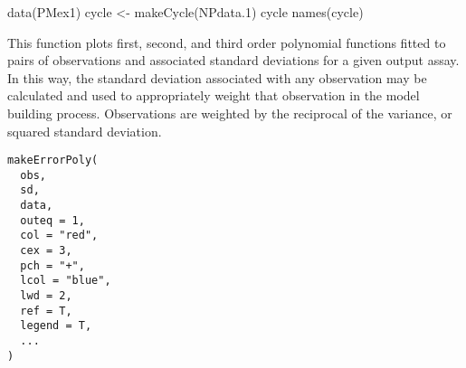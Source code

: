 \documentclass[a4paper]{book}
\begin{document}
%
\begin{Examples}
\begin{ExampleCode}
data(PMex1)
cycle <- makeCycle(NPdata.1)
cycle
names(cycle)
\end{ExampleCode}
\end{Examples}
%
\begin{Description}\relax
This function plots first, second, and third order polynomial functions fitted
to pairs of observations and associated standard deviations for a given output assay.
In this way, the standard deviation associated with any observation may be calculated and
used to appropriately weight that observation in the model building process.  Observations
are weighted by the reciprocal of the variance, or squared standard deviation.
\end{Description}
%
\begin{Usage}
\begin{verbatim}
makeErrorPoly(
  obs,
  sd,
  data,
  outeq = 1,
  col = "red",
  cex = 3,
  pch = "+",
  lcol = "blue",
  lwd = 2,
  ref = T,
  legend = T,
  ...
)
\end{verbatim}
\end{Usage}
%
\end{document}
